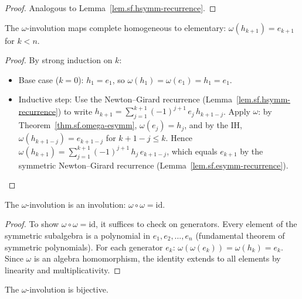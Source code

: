 \begin{proof}
Analogous to Lemma~\ref{lem.sf.hsymm-recurrence}.
\end{proof}

\begin{theorem}
\label{thm.sf.omega-hsymm}
\leanhelper
\leanok
The $\omega$-involution maps complete homogeneous to elementary:
$\omega(h_{k+1}) = e_{k+1}$ for $k < n$.
\end{theorem}

\begin{proof}
\leanok
By strong induction on $k$:
\begin{itemize}
\item Base case ($k = 0$): $h_1 = e_1$, so
$\omega(h_1) = \omega(e_1) = h_1 = e_1$.
\item Inductive step: Use the Newton--Girard recurrence
(Lemma~\ref{lem.sf.hsymm-recurrence}) to write
$h_{k+1} = \sum_{j=1}^{k+1} (-1)^{j+1}\, e_j\, h_{k+1-j}$.
Apply $\omega$: by Theorem~\ref{thm.sf.omega-esymm},
$\omega(e_j) = h_j$, and by the IH,
$\omega(h_{k+1-j}) = e_{k+1-j}$ for $k+1-j \leq k$.
Hence $\omega(h_{k+1}) = \sum_{j=1}^{k+1} (-1)^{j+1}\, h_j\, e_{k+1-j}$,
which equals $e_{k+1}$ by the symmetric
Newton--Girard recurrence (Lemma~\ref{lem.sf.esymm-recurrence}).
\end{itemize}
\end{proof}

\begin{theorem}
\label{thm.sf.omega-involutive}
\leanhelper
\leanok
The $\omega$-involution is an involution: $\omega \circ \omega = \mathrm{id}$.
\end{theorem}

\begin{proof}
\leanok
To show $\omega \circ \omega = \mathrm{id}$, it suffices to check on
generators. Every element of the symmetric subalgebra is a polynomial
in $e_1, e_2, \ldots, e_n$ (fundamental theorem of symmetric polynomials).
For each generator $e_k$:
$\omega(\omega(e_k)) = \omega(h_k) = e_k$.
Since $\omega$ is an algebra homomorphism, the identity extends to all
elements by linearity and multiplicativity.
\end{proof}

\begin{theorem}
\label{thm.sf.omega-bijective}
\leanhelper
\leanok
The $\omega$-involution is bijective.
\end{theorem}

